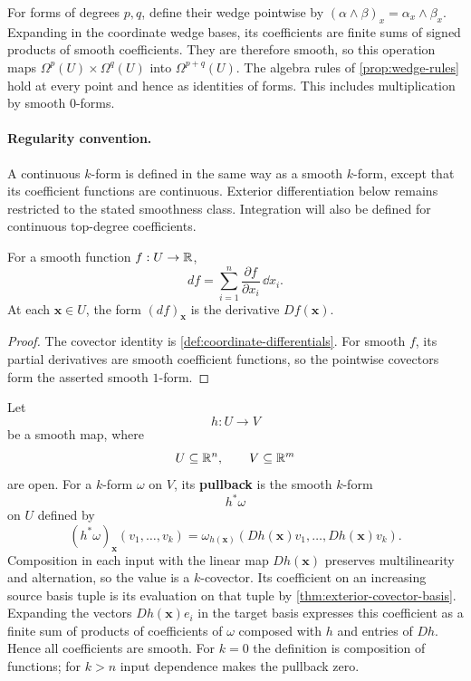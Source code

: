 For forms of degrees $p,q$, define their wedge pointwise by
$(\alpha\wedge\beta)_x=\alpha_x\wedge\beta_x$. Expanding in the coordinate
wedge bases, its coefficients are finite sums of signed products of smooth
coefficients. They are therefore smooth, so this operation maps
$\Omega^p(U)\times\Omega^q(U)$ into $\Omega^{p+q}(U)$.
The algebra rules of \cref{prop:wedge-rules} hold at every point and hence
as identities of forms. This includes multiplication by smooth $0$-forms.

\paragraph{Regularity convention.}
A continuous $k$-form is defined in the same way as a smooth $k$-form,
except that its coefficient functions are continuous. Exterior
differentiation below remains restricted to the stated smoothness class.
Integration will also be defined for continuous top-degree coefficients.

\begin{proposition}
\label{prop:differential-of-function}
For a smooth function \(f:U\to\mathbb{R}\),
\[
df=\sum_{i=1}^{n}\frac{\partial f}{\partial x_i}\,\dd x_i.
\]
At each \(\mathbf{x}\in U\), the form \((df)_{\mathbf{x}}\) is the derivative \(Df(\mathbf{x})\).
\end{proposition}
\begin{proof}
The covector identity is \cref{def:coordinate-differentials}. For smooth
$f$, its partial derivatives are smooth coefficient functions, so the
pointwise covectors form the asserted smooth $1$-form.
\end{proof}

\begin{definition}[Pullback]\label{def:euclidean-form-pullback}
Let
\[
h:U\longrightarrow V
\]
be a smooth map, where
\[
U\subseteq\mathbb{R}^n,
\qquad
V\subseteq\mathbb{R}^m
\]
are open.  For a $k$-form $\omega$ on $V$, its \textbf{pullback} is the
smooth $k$-form
\[
h^*\omega
\]
on $U$ defined by
\[
(h^*\omega)_{\mathbf{x}}(v_1,\ldots,v_k)
=
\omega_{h(\mathbf{x})}(Dh(\mathbf{x})v_1,\ldots,Dh(\mathbf{x})v_k).
\]
Composition in each input with the linear map $Dh(\mathbf{x})$ preserves
multilinearity and alternation, so the value is a $k$-covector.
Its coefficient on an increasing source basis tuple is its evaluation on
that tuple by \cref{thm:exterior-covector-basis}. Expanding the vectors
$Dh(\mathbf{x})e_i$ in the target basis expresses this coefficient as a finite
sum of products of coefficients of $\omega$ composed with $h$ and
entries of $Dh$. Hence all coefficients are smooth. For $k=0$ the
definition is composition of functions; for $k>n$ input dependence makes
the pullback zero.
\end{definition}

